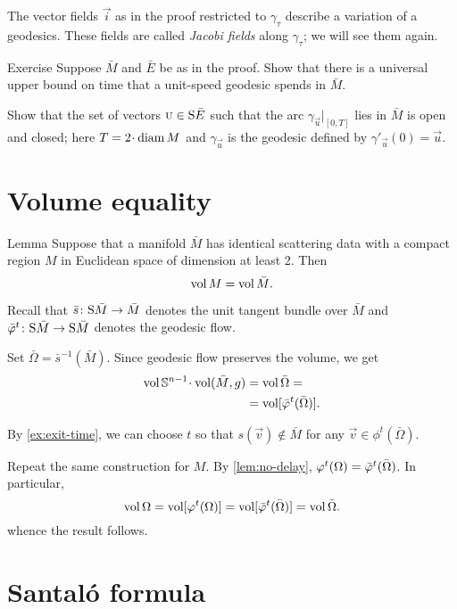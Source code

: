 The vector fields $\vec i$  as in the proof restricted to $\gamma_\tau$ describe a variation of a geodesics.
These fields are called \emph{Jacobi fields} along $\gamma_\tau$;
we will see them again.

\begin{thm}{Exercise}\label{ex:exit-time}
Suppose $\bar M$ and $\bar E$ be as in the proof.
Show that there is a universal upper bound on time that a unit-speed geodesic spends in $\bar M$.
\end{thm}

 Show that the set of vectors $\vec u\in\S \bar E$ such that the arc $\gamma_{\vec u}|_{[0, T]}$ lies in $\bar M$ is open and closed;
here $T=2\cdot\diam M$ and $\gamma_{\vec u}$ is the geodesic defined by $\gamma'_{\vec u}(0)=\vec u$.

\section{Volume equality}

\begin{thm}{Lemma}\label{lem:vol=}
Suppose that a manifold $\bar M$ has identical scattering data with a compact region $M$ in Euclidean space of dimension at least 2.
Then 
\[\vol M=\vol \bar M.\]

\end{thm}

Recall that $\bar s\:\S \bar M\to \bar M$ denotes the unit tangent bundle over $\bar M$
and $\bar\phi^t\:\S \bar M\to \S \bar M$ denotes the geodesic flow.

Set $\bar\Omega=\bar s^{-1}(\bar M)$.
Since geodesic flow preserves the volume, we get 
\begin{align*}
\vol\SSS^{n-1}\cdot\vol(\bar M,g)&=\vol\bar\Omega=
\\
&=\vol[\bar\phi^t(\bar\Omega)].
\end{align*}

By \ref{ex:exit-time}, we can choose $t$ so that $s(\vec v)\notin \bar M$ for any $\vec v\in \phi^t(\bar\Omega)$.

Repeat the same construction for $M$. 
By \ref{lem:no-delay}, $\phi^t(\Omega)\z=\bar\phi^t(\bar\Omega)$.
In particular, 
\[
\vol\Omega=
\vol[\phi^t(\Omega)]=
\vol[\bar\phi^t(\bar\Omega)]=
\vol\bar\Omega.
\]
whence the result follows.
\qeds

\section{Santal\'{o} formula}

